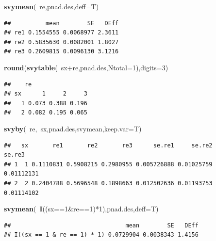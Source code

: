 \documentclass[]{book}
\newenvironment{Shaded}{\begin{snugshade}}{\end{snugshade}}
\newcommand{\KeywordTok}[1]{\textcolor[rgb]{0.13,0.29,0.53}{\textbf{{#1}}}}
\newcommand{\DataTypeTok}[1]{\textcolor[rgb]{0.13,0.29,0.53}{{#1}}}
\newcommand{\DecValTok}[1]{\textcolor[rgb]{0.00,0.00,0.81}{{#1}}}
\newcommand{\NormalTok}[1]{{#1}}
\numberwithin{example}{chapter}
\numberwithin{remark}{chapter}
\numberwithin{definition}{chapter}
\begin{document}
\begin{Shaded}
\begin{Highlighting}[]
\KeywordTok{svymean}\NormalTok{(~re,pnad.des,}\DataTypeTok{deff=}\NormalTok{T)}
\end{Highlighting}
\end{Shaded}

\begin{verbatim}
##          mean        SE   DEff
## re1 0.1554555 0.0068977 2.3611
## re2 0.5835630 0.0082001 1.8027
## re3 0.2609815 0.0096130 3.1216
\end{verbatim}

\begin{Shaded}
\begin{Highlighting}[]
\KeywordTok{round}\NormalTok{(}\KeywordTok{svytable}\NormalTok{(~sx+re,pnad.des,}\DataTypeTok{Ntotal=}\DecValTok{1}\NormalTok{),}\DataTypeTok{digits=}\DecValTok{3}\NormalTok{)}
\end{Highlighting}
\end{Shaded}

\begin{verbatim}
##    re
## sx      1     2     3
##   1 0.073 0.388 0.196
##   2 0.082 0.195 0.065
\end{verbatim}

\begin{Shaded}
\begin{Highlighting}[]
\KeywordTok{svyby}\NormalTok{(~re,~sx,pnad.des,svymean,}\DataTypeTok{keep.var=}\NormalTok{T)}
\end{Highlighting}
\end{Shaded}

\begin{verbatim}
##   sx       re1       re2       re3      se.re1     se.re2     se.re3
## 1  1 0.1110831 0.5908215 0.2980955 0.005726888 0.01025759 0.01112131
## 2  2 0.2404788 0.5696548 0.1898663 0.012502636 0.01193753 0.01114102
\end{verbatim}

\begin{Shaded}
\begin{Highlighting}[]
\KeywordTok{svymean}\NormalTok{(~}\KeywordTok{I}\NormalTok{((sx==}\DecValTok{1}\NormalTok{&re==}\DecValTok{1}\NormalTok{)*}\DecValTok{1}\NormalTok{),pnad.des,}\DataTypeTok{deff=}\NormalTok{T)}
\end{Highlighting}
\end{Shaded}

\begin{verbatim}
##                                 mean        SE   DEff
## I((sx == 1 & re == 1) * 1) 0.0729904 0.0038343 1.4156
\end{verbatim}
\end{document}
